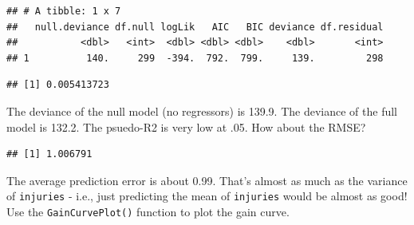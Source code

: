 \documentclass[
]{book}
\newenvironment{Shaded}{\begin{snugshade}}{\end{snugshade}}
\newcommand{\DataTypeTok}[1]{\textcolor[rgb]{0.13,0.29,0.53}{#1}}
\newcommand{\DecValTok}[1]{\textcolor[rgb]{0.00,0.00,0.81}{#1}}
\newcommand{\KeywordTok}[1]{\textcolor[rgb]{0.13,0.29,0.53}{\textbf{#1}}}
\newcommand{\NormalTok}[1]{#1}
\newcommand{\OperatorTok}[1]{\textcolor[rgb]{0.81,0.36,0.00}{\textbf{#1}}}
\newcommand{\StringTok}[1]{\textcolor[rgb]{0.31,0.60,0.02}{#1}}
\begin{document}
\begin{verbatim}
## # A tibble: 1 x 7
##   null.deviance df.null logLik   AIC   BIC deviance df.residual
##           <dbl>   <int>  <dbl> <dbl> <dbl>    <dbl>       <int>
## 1          140.     299  -394.  792.  799.     139.         298
\end{verbatim}

\begin{Shaded}
\end{Shaded}

\begin{verbatim}
## [1] 0.005413723
\end{verbatim}

The deviance of the null model (no regressors) is 139.9. The deviance of the full model is 132.2. The psuedo-R2 is very low at .05. How about the RMSE?

\begin{Shaded}
\end{Shaded}

\begin{verbatim}
## [1] 1.006791
\end{verbatim}

The average prediction error is about 0.99. That's almost as much as the variance of \texttt{injuries} - i.e., just predicting the mean of \texttt{injuries} would be almost as good! Use the \texttt{GainCurvePlot()} function to plot the gain curve.

\begin{Shaded}
\end{Shaded}
\end{document}
